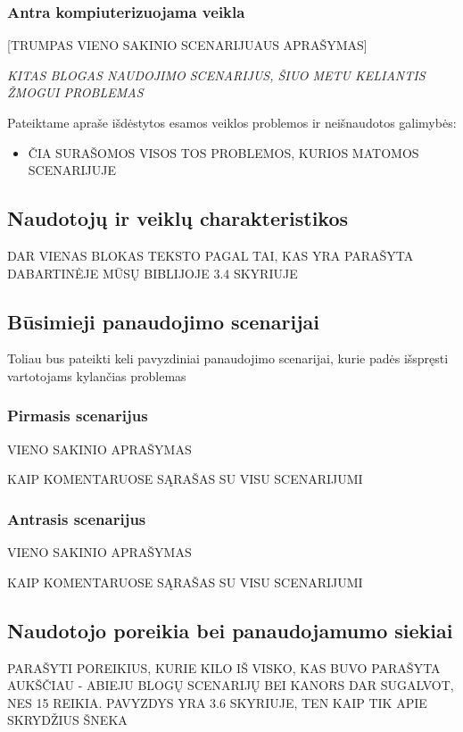 \documentclass{VUMIFPSkursinis}
\begin{document}
\subsubsection{Antra kompiuterizuojama veikla}
[TRUMPAS VIENO SAKINIO SCENARIJUAUS APRAŠYMAS]

\textit{KITAS BLOGAS NAUDOJIMO SCENARIJUS, ŠIUO METU KELIANTIS ŽMOGUI PROBLEMAS}

Pateiktame apraše išdėstytos esamos veiklos problemos ir neišnaudotos galimybės:  
\begin{itemize}
\item ČIA SURAŠOMOS VISOS TOS PROBLEMOS, KURIOS MATOMOS SCENARIJUJE
\end{itemize}

\subsection{Naudotojų ir veiklų charakteristikos}
DAR VIENAS BLOKAS TEKSTO PAGAL TAI, KAS YRA PARAŠYTA DABARTINĖJE MŪSŲ BIBLIJOJE 3.4 SKYRIUJE

\subsection{Būsimieji panaudojimo scenarijai}
Toliau bus pateikti keli pavyzdiniai panaudojimo scenarijai, kurie padės išspręsti vartotojams kylančias problemas

\subsubsection{Pirmasis scenarijus}
VIENO SAKINIO APRAŠYMAS

KAIP KOMENTARUOSE SĄRAŠAS SU VISU SCENARIJUMI

\subsubsection{Antrasis scenarijus}
VIENO SAKINIO APRAŠYMAS

KAIP KOMENTARUOSE SĄRAŠAS SU VISU SCENARIJUMI

\subsection{Naudotojo poreikia bei panaudojamumo siekiai}
PARAŠYTI POREIKIUS, KURIE KILO IŠ VISKO, KAS BUVO PARAŠYTA AUKŠČIAU - ABIEJU BLOGŲ SCENARIJŲ BEI KANORS DAR SUGALVOT, NES 15 REIKIA. PAVYZDYS YRA 3.6 SKYRIUJE, TEN KAIP TIK APIE SKRYDŽIUS ŠNEKA
\end{document}

